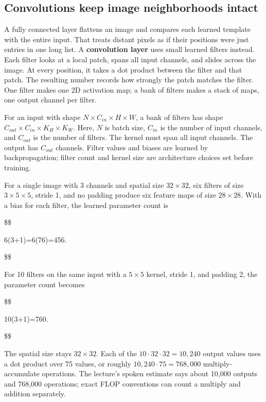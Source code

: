 \subsection{Convolutions keep image neighborhoods intact}\label{04-visual-computing-ii-ch031-convolutions-keep-image-neighborhoods-intact}

A fully connected layer flattens an image and compares each learned template with the entire input. That treats distant pixels as if their positions were just entries in one long list. A \textbf{convolution layer} uses small learned filters instead. Each filter looks at a local patch, spans all input channels, and slides across the image. At every position, it takes a dot product between the filter and that patch. The resulting number records how strongly the patch matches the filter. One filter makes one 2D activation map; a bank of filters makes a stack of maps, one output channel per filter.

For an input with shape \(N\times C_{in}\times H\times W\), a bank of filters has shape \(C_{out}\times C_{in}\times K_H\times K_W\). Here, \(N\) is batch size, \(C_{in}\) is the number of input channels, and \(C_{out}\) is the number of filters. The kernel must span all input channels. The output has \(C_{out}\) channels. Filter values and biases are learned by backpropagation; filter count and kernel size are architecture choices set before training.

For a single image with 3 channels and spatial size \(32\times32\), six filters of size \(3\times5\times5\), stride 1, and no padding produce six feature maps of size \(28\times28\). With a bias for each filter, the learned parameter count is

\$\$

6(3+1)=6(76)=456.

\$\$

For 10 filters on the same input with a \(5\times5\) kernel, stride 1, and padding 2, the parameter count becomes

\$\$

10(3+1)=760.

\$\$

The spatial size stays \(32\times32\). Each of the \(10\cdot32\cdot32=10{,}240\) output values uses a dot product over 75 values, or roughly \(10{,}240\cdot75=768{,}000\) multiply-accumulate operations. The lecture's spoken estimate says about 10,000 outputs and 768,000 operations; exact FLOP conventions can count a multiply and addition separately.

